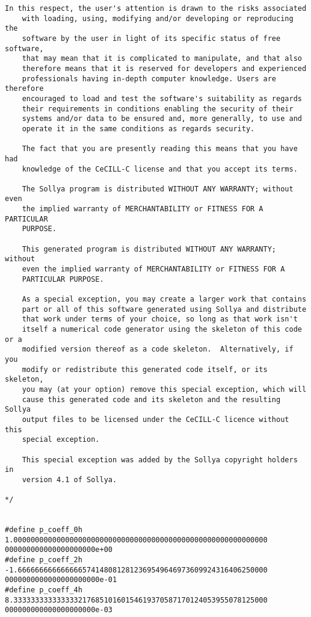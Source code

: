 \begin{center}
\begin{minipage}{15cm}
\begin{Verbatim}[frame=single]
    In this respect, the user's attention is drawn to the risks associated
    with loading, using, modifying and/or developing or reproducing the
    software by the user in light of its specific status of free software,
    that may mean that it is complicated to manipulate, and that also
    therefore means that it is reserved for developers and experienced
    professionals having in-depth computer knowledge. Users are therefore
    encouraged to load and test the software's suitability as regards
    their requirements in conditions enabling the security of their
    systems and/or data to be ensured and, more generally, to use and
    operate it in the same conditions as regards security.
    
    The fact that you are presently reading this means that you have had
    knowledge of the CeCILL-C license and that you accept its terms.
    
    The Sollya program is distributed WITHOUT ANY WARRANTY; without even
    the implied warranty of MERCHANTABILITY or FITNESS FOR A PARTICULAR
    PURPOSE.
    
    This generated program is distributed WITHOUT ANY WARRANTY; without
    even the implied warranty of MERCHANTABILITY or FITNESS FOR A
    PARTICULAR PURPOSE.
    
    As a special exception, you may create a larger work that contains
    part or all of this software generated using Sollya and distribute
    that work under terms of your choice, so long as that work isn't
    itself a numerical code generator using the skeleton of this code or a
    modified version thereof as a code skeleton.  Alternatively, if you
    modify or redistribute this generated code itself, or its skeleton,
    you may (at your option) remove this special exception, which will
    cause this generated code and its skeleton and the resulting Sollya
    output files to be licensed under the CeCILL-C licence without this
    special exception.
    
    This special exception was added by the Sollya copyright holders in
    version 4.1 of Sollya.
    
*/


#define p_coeff_0h 1.00000000000000000000000000000000000000000000000000000000000
000000000000000000000e+00
#define p_coeff_2h -1.6666666666666665741480812812369549646973609924316406250000
0000000000000000000000e-01
#define p_coeff_4h 8.33333333333333321768510160154619370587170124053955078125000
000000000000000000000e-03



\end{Verbatim}
\end{minipage}
\end{center}
